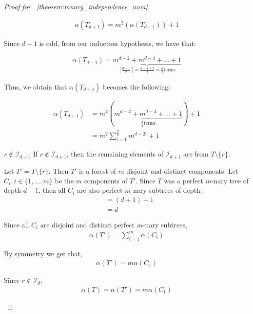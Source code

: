 \documentclass{amsart}
\theoremstyle{definition}
\begin{document}
\begin{proof}[Proof for ~\ref{theorem:mnary_independence_num}]
\begin{caseof}
\begin{subcaseof}
			\begin{align*}
				\alpha(T_{d + 1}) = m^2(\alpha(T_{d - 1})) + 1
			\end{align*}

			Since $d - 1$ is odd, from our induction hypothesis, we have that:

			\begin{align*}
				\alpha(T_{d - 1}) = \underbrace{m^{d - 2} + m^{d - 4} + \dots + 1}_{\left\lceil\frac{d - 1}{2}\right\rceil = \frac{d - 1 + 1}{2} = \frac{d}{2} \text{terms}}
			\end{align*}

			Thus, we obtain that $\alpha(T_{d+1})$ becomes the following:

			\begin{align}
				\alpha(T_{d + 1}) & = m^2(\underbrace{m^{d - 2} + m^{d - 4} + \dots + 1}_{\frac{d}{2} \text{terms}}) + 1 \nonumber \\
				                  & = m^2 \displaystyle\sum_{i = 1}^{\frac{d}{2}}m^{d - 2i} + 1
				\label{eq:mnary_even_case_root_in}
			\end{align}

			\item  $r \not\in \mathcal{I}_{d+1}$
			If $r \not\in \mathcal{I}_{d + 1}$, then the remaining elements of $\mathcal{I}_{d + 1}$ are from $T \setminus \{r\}$.


			Let $T' = T\setminus\{r\}$. Then $T'$ is a forest of $m$ disjoint and distinct components. Let $C_i, i \in \{1, \dots, m\}$ be the $m$ components of $T'$. Since $T$ was a perfect $m$-nary tree of depth $d + 1$, then all $C_i$ are also perfect $m$-nary subtrees of depth:
			\begin{align*}
				 & = (d + 1) - 1 \\
				 & = d
			\end{align*}

			Since all $C_i$ are disjoint and distinct perfect $m$-nary subtrees,
			\begin{align*}
				\alpha(T') = \displaystyle\sum_{i = 1}^{m}\alpha(C_i)
			\end{align*}

			By symmetry we get that,
			\begin{align*}
				\alpha(T') = m \alpha(C_1)
			\end{align*}

			Since $r \not\in \mathcal{I}_d$,
			\begin{align*}
				\alpha(T) = \alpha(T') = m \alpha(C_1)
			\end{align*}


\end{subcaseof}
\end{caseof}
\end{proof}
\end{document}
